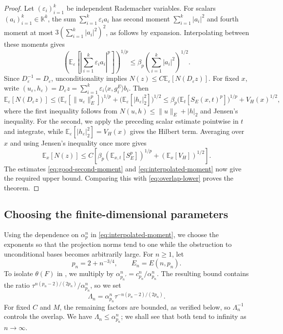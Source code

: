\documentclass[11pt,a4paper,reqno]{amsart}
\theoremstyle{definition}
\newcommand{\eps}{\varepsilon}
\newcommand{\norm}[1]{\lVert #1\rVert}
\numberwithin{equation}{section}
\begin{document}
\begin{proof}
Let $(\eps_i)_{i=1}^k$ be independent Rademacher variables. For scalars $(a_i)_{i=1}^k\in\mathbb K^k$, the sum $\sum_{i=1}^k\eps_i a_i$ has second moment $\sum_{i=1}^k|a_i|^2$ and fourth moment at most $3(\sum_{i=1}^k|a_i|^2)^2$, as follows by expansion. Interpolating between these moments gives
\begin{equation*}
 \left(\mathbb E_\eps\left[\left|\sum_{i=1}^k\eps_i a_i\right|^p\right]\right)^{1/p}
 \leq\beta_p\left(\sum_{i=1}^k|a_i|^2\right)^{1/2}.
\end{equation*}
Since $D_\eps^{-1}=D_\eps$, unconditionality implies $N(z)\leq C\mathbb E_\eps[N(D_\eps z)]$. For fixed $x$, write $(u_\eps,h_\eps)=D_\eps z=\sum_{i=1}^k\eps_i\langle x,g_i^E\rangle b_i$. Then
\begin{equation*}
 \mathbb E_\eps[N(D_\eps z)]
 \leq\bigl(\mathbb E_\eps[\norm{u_\eps}_E^p]\bigr)^{1/p}
       +\bigl(\mathbb E_\eps[|h_\eps|_2^2]\bigr)^{1/2}
 \leq\beta_p\bigl(\mathbb E_t[S_E(x,t)^p]\bigr)^{1/p}+V_H(x)^{1/2},
\end{equation*}
where the first inequality follows from $N(u,h)\leq\norm u_E+|h|_2$ and Jensen's inequality. For the second, we apply the preceding scalar estimate pointwise in $t$ and integrate, while $\mathbb E_\eps[|h_\eps|_2^2]=V_H(x)$ gives the Hilbert term. Averaging over $x$ and using Jensen's inequality once more gives
\begin{equation}\label{eq:randomisation-bound}
 \mathbb E_x[N(z)]
 \leq C\left[\beta_p(\mathbb E_{x,t}[S_E^p])^{1/p}
                         +(\mathbb E_x[V_H])^{1/2}\right].
\end{equation}
The estimates \eqref{eq:good-second-moment} and \eqref{eq:interpolated-moment} now give the required upper bound. Comparing this with \eqref{eq:overlap-lower} proves the theorem.
\end{proof}
\subsection{Choosing the finite-dimensional parameters}\label{sec:parameters}

Using the dependence on $\alpha_p^n$ in \eqref{eq:interpolated-moment}, we choose the exponents so that the projection norms tend to one while the obstruction to unconditional bases becomes arbitrarily large. For $n\geq1$, let
\begin{equation}\label{eq:parameters}
 p_n=2+n^{-3/4},\qquad E_n=E(n,p_n).
\end{equation}
To isolate $\theta(F)$ in , we multiply by $\alpha_{p_n'}^n=c_{p_n}^n/\alpha_{p_n}^n$. The resulting bound contains the ratio $\tau^{n(p_n-2)/(2p_n)}/\alpha_{p_n}^n$, so we set
\begin{equation}\label{eq:separation-scale}
 \Lambda_n=\alpha_{p_n}^n\tau^{-n(p_n-2)/(2p_n)}.
\end{equation}
For fixed $C$ and $M$, the remaining factors are bounded, as verified below, so $\Lambda_n^{-1}$ controls the overlap. We have $\Lambda_n\leq \alpha_{p_n}^n$; we shall see that both tend to infinity as $n\to\infty$.
\end{document}
